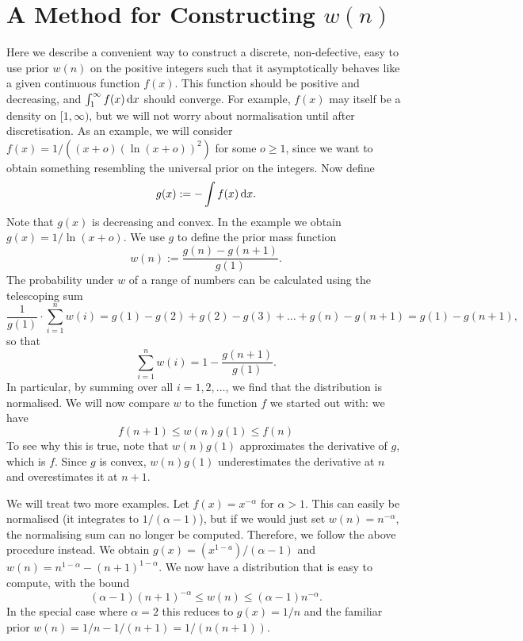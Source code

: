 \documentclass[a4paper]{article}
\theoremstyle{example}
\theoremstyle{remark}
\newcommand{\dif}{\,\textnormal{d}}
\begin{document}
\section{A Method for Constructing $w(n)$}
Here we describe a convenient way to construct a discrete,
non-defective, easy to use prior $w(n)$ on the positive integers such
that it asymptotically behaves like a given continuous function
$f(x)$. This function should be positive and decreasing, and
$\int_1^\infty f(x)\dif x$ should converge. For example, $f(x)$ may
itself be a density on $[1,\infty)$, but we will not worry about
normalisation until after discretisation. As an example, we will
consider $f(x)=1/((x+o)(\ln(x+o))^2)$ for some $o\ge1$, since we want
to obtain something resembling the universal prior on the
integers. Now define
\begin{equation}
  g(x):=-\int f(x)\dif x.
\end{equation}
Note that $g(x)$ is decreasing and convex. In the example we obtain
$g(x)=1/\ln(x+o)$. We use $g$ to define the prior mass function
\begin{equation}
  w(n):=\frac{g(n)-g(n+1)}{g(1)}.
\end{equation}
The probability under $w$ of a range of numbers can be calculated
using the telescoping sum
\[
  \frac{1}{g(1)}\cdot \sum_{i=1}^n w(i) =
  g(1)-g(2)+g(2)-g(3)+\ldots+g(n)-g(n+1)=g(1)-g(n+1),
\]
so that
\begin{equation}
  \sum_{i=1}^n w(i)=1-\frac{g(n+1)}{g(1)}.
\end{equation}
In particular, by summing over all $i=1,2,\ldots$, we find that the
distribution is normalised. We will now compare $w$ to the function
$f$ we started out with: we have
\begin{equation}
  f(n+1)\le w(n)g(1)\le f(n)
\end{equation}
To see why this is true, note that $w(n)g(1)$ approximates the
derivative of $g$, which is $f$. Since $g$ is convex, $w(n)g(1)$
underestimates the derivative at $n$ and overestimates it at $n+1$.

We will treat two more examples. Let $f(x)=x^{-\alpha}$ for
$\alpha>1$. This can easily be normalised (it integrates to
$1/(\alpha-1)$), but if we would just set $w(n)=n^{-\alpha}$, the
normalising sum can no longer be computed. Therefore, we follow the
above procedure instead. We obtain $g(x)=(x^{1-a})/(\alpha-1)$ and
$w(n)=n^{1-\alpha}-(n+1)^{1-\alpha}$. We now have a distribution that is easy to
compute, with the bound
\[
(\alpha-1)(n+1)^{-\alpha}\le w(n)\le (\alpha-1)n^{-\alpha}.
\]
In the special case where $\alpha=2$ this reduces to $g(x)=1/n$ and
the familiar prior $w(n)=1/n-1/(n+1)=1/(n(n+1))$.
\end{document}
